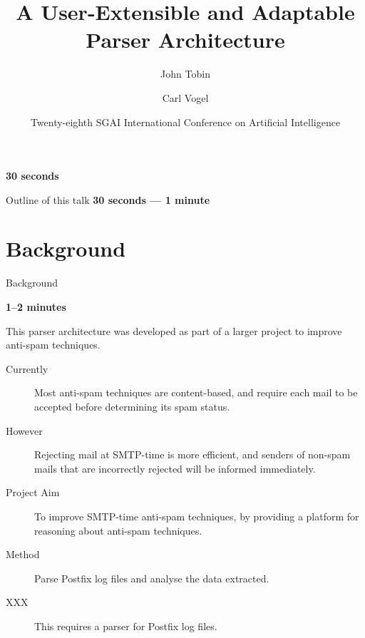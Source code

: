 \documentclass{beamer}
\title{A User-Extensible and Adaptable Parser Architecture}
\author{John Tobin \and Carl Vogel}
\institute[Trinity College]
{
  School of Computer Science and Statistics\\
  Trinity College, University of Dublin
}
\date[SGAI 2008]{Twenty-eighth SGAI International Conference on Artificial Intelligence}
\newcommand{\timingnote}[1]{%
    \textbf{#1}%
}
\begin{document}
\begin{frame}
    \timingnote{30 seconds}
    \titlepage{}
\end{frame}

\begin{frame}{Outline of this talk}
    \timingnote{30 seconds --- 1 minute}
    \tableofcontents{}
\end{frame}





\section{Background}

\begin{frame}{Background}

    \timingnote{1--2 minutes}

    This parser architecture was developed as part of a larger project to
    improve anti-spam techniques.

    \begin{description}

        \item [Currently] Most anti-spam techniques are content-based, and
            require each mail to be accepted before determining its spam
            status.

        \item [However] Rejecting mail at SMTP-time is more efficient, and
            senders of non-spam mails that are incorrectly rejected will be
            informed immediately.

        \item [Project Aim] To improve SMTP-time anti-spam techniques, by
            providing a platform for reasoning about anti-spam techniques.

        \item [Method] Parse Postfix log files and analyse the data
            extracted.

        \item [XXX] This requires a parser for Postfix log files.

    \end{description}

\end{frame}
\end{document}

